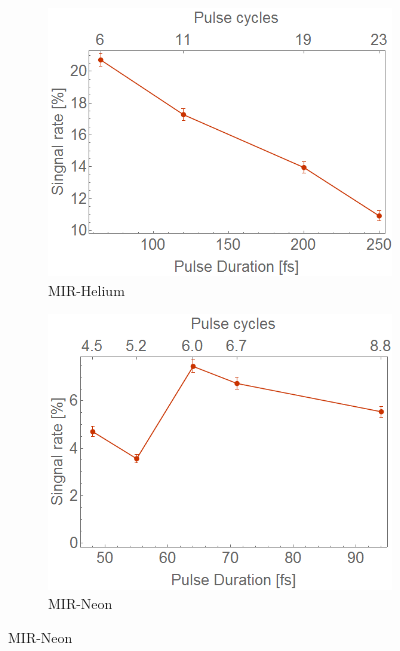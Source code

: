 \begin{figure}[h!]
\begin{subfigure}[l]{0.48\textwidth}
\caption{MIR-Helium}
\includegraphics[width=1\textwidth]{../Images/results/MIR_He_pulsescan/raw/signalrate.png} %
\end{subfigure}
\begin{subfigure}[l]{0.48\textwidth}
\caption{MIR-Neon}
\includegraphics[width=1\textwidth]{../Images/results/MIR_Ne_pulseduration/SigRate.png} %
\end{subfigure}



\end{figure}
